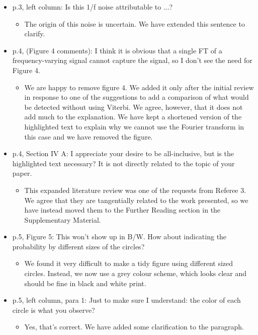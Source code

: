\documentclass[a4paper, 10pt]{letter}
\begin{document}
\begin{itemize}
\item p.3, left column: Is this 1/f noise attributable to ...?
\begin{itemize}
\item The origin of this noise is uncertain. We have extended this sentence to clarify. 
\end{itemize}

\item p.4, (Figure 4 comments):  I think it is obvious that a single FT of a frequency-varying signal cannot capture the signal, so I don't see the need for Figure 4. 
\begin{itemize}
\item We are happy to remove figure 4. We added it only after the initial review in response to one of the suggestions to add a comparison of what would be detected without using Viterbi. We agree, however, that it does not add much to the explanation. We have kept a shortened version of the highlighted text to explain why we cannot use the Fourier transform in this case and we have removed the figure. 
\end{itemize}

\item p.4, Section IV A: I appreciate your desire to be all-inclusive, but is the highlighted text necessary? It is not directly related to the topic of your paper. 
\begin{itemize}
\item This expanded literature review was one of the requests from Referee 3. We agree that they are tangentially related to the work presented, so we have instead moved them to the Further Reading section in the Supplementary Material. 
\end{itemize}

\item p.5, Figure 5: This won't show up in B/W. How about indicating the probability by different sizes of the circles? 
\begin{itemize}
\item We found it very difficult to make a tidy figure using different sized circles. Instead, we now use a grey colour scheme, which looks clear and should be fine in black and white print. 
\end{itemize}

\item p.5, left column, para 1: Just to make sure I understand: the color of each circle is what you observe?
\begin{itemize}
\item Yes, that's correct. We have added some clarification to the paragraph.
\end{itemize}


\end{itemize}
\end{document}
